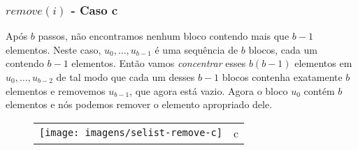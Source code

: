 \documentclass{beamer}
\begin{document}
\begin{frame}[shrink]
\frametitle{$remove(i)$ - Caso c}
Após \ensuremath{\ensuremath{\ensuremath{\mathit{b}}}} passos, não encontramos nenhum bloco contendo mais que
$\ensuremath{\ensuremath{\ensuremath{\mathit{b}}}}-1$ elementos. Neste caso, $\ensuremath{\ensuremath{\ensuremath{\mathit{u}}}}_0,\ldots,\ensuremath{\ensuremath{\ensuremath{\mathit{u}}}}_{\ensuremath{\ensuremath{\ensuremath{\mathit{b}}}}-1}$ é uma sequência de \ensuremath{\ensuremath{\ensuremath{\mathit{b}}}} blocos, cada um contendo $\ensuremath{\ensuremath{\ensuremath{\mathit{b}}}}-1$ elementos.  Então vamos \emph{concentrar}
esses $\ensuremath{\ensuremath{\ensuremath{\mathit{b}}}}(\ensuremath{\ensuremath{\ensuremath{\mathit{b}}}}-1)$ elementos em $\ensuremath{\ensuremath{\ensuremath{\mathit{u}}}}_0,\ldots,\ensuremath{\ensuremath{\ensuremath{\mathit{u}}}}_{\ensuremath{\ensuremath{\ensuremath{\mathit{b}}}}-2}$ de tal modo que cada um desses $\ensuremath{\ensuremath{\ensuremath{\mathit{b}}}}-1$ blocos contenha exatamente \ensuremath{\ensuremath{\ensuremath{\mathit{b}}}} elementos e removemos
$\ensuremath{\ensuremath{\ensuremath{\mathit{u}}}}_{\ensuremath{\ensuremath{\ensuremath{\mathit{b}}}}-1}$, que agora está vazio.  Agora o bloco  $\ensuremath{\ensuremath{\ensuremath{\mathit{u}}}}_0$ contém \ensuremath{\ensuremath{\ensuremath{\mathit{b}}}}
elementos  e nós podemos remover o elemento apropriado dele.
\begin{figure}
  \noindent
  \begin{center}
    \begin{tabular}{lc}
      \texttt{[image: imagens/selist-remove-c]}& c\\
    \end{tabular}
  \end{center}
\end{figure}
\end{frame}
\end{document}
